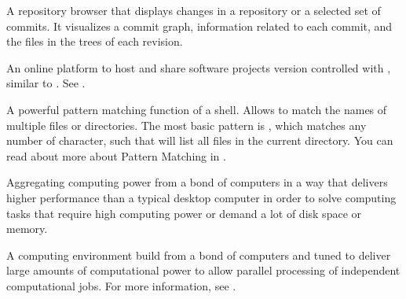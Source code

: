 \begin{description}
\ignorespaces 
\sphinxAtStartPar
A repository browser that displays changes in a repository or a selected set of commits. It
visualizes a commit graph, information related to each commit, and the files in the trees
of each revision.

\ignorespaces 
\sphinxAtStartPar
An online platform to host and share software projects version controlled with {\hyperref[\detokenize{glossary:term-Git}]{}},
similar to {\hyperref[\detokenize{glossary:term-GitHub}]{}}. See .

\ignorespaces 
\sphinxAtStartPar
A powerful pattern matching function of a shell. Allows to match the names of multiple files
or directories. The most basic pattern is \sphinxcode{\sphinxupquote{*}}, which matches any number of character, such
that  will list all  files in the current directory.
You can read about more about Pattern Matching in
.

\sphinxAtStartPar
Aggregating computing power from a bond of computers in a way that delivers higher performance than a typical desktop computer in order to solve computing tasks that require high computing power or demand a lot of disk space or memory.

\sphinxAtStartPar
A computing environment build from a bond of computers and tuned to deliver large amounts of computational power to allow parallel processing of independent computational jobs. For more information, see .


\end{description}
